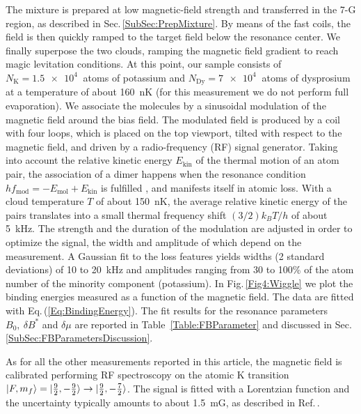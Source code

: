 The mixture is prepared at low magnetic-field strength and transferred in the 7-G region, as described in Sec.\,\ref{SubSec:PrepMixture}. By means of the fast coils, the field is then quickly ramped to the target field below the resonance center. We finally superpose the two clouds, ramping the magnetic field gradient to reach magic levitation conditions. At this point, our sample consists  of {$N_{\mathrm{K}}=\SI{1.5e4}{}$} atoms of potassium and {$N_{\mathrm{Dy}}=\SI{7e4}{}$} atoms of dysprosium at a temperature of about \SI{160}{\nano\kelvin} (for this measurement we do not perform full evaporation).
We associate the molecules by a sinusoidal modulation of the magnetic field around the bias field. The modulated field is produced by a coil with four loops, which is placed on the top viewport, tilted with respect to the magnetic field, and driven by a radio-frequency (RF) signal generator. Taking into account the relative kinetic energy $E_{\mathrm{kin}}$ of the thermal motion of an atom pair, the association of a dimer happens when the resonance condition $hf_{\mathrm{mod}}=-E_{\mathrm{mol}}+E_{\mathrm{kin}}$ is fulfilled \cite{Hanna2007AOM,Weber2008aou,Mohapatra2015has}, and manifests itself in atomic loss. With a cloud temperature $T$ of about \SI{150}{\nano\kelvin}, the average relative kinetic energy of the pairs translates into a small thermal frequency shift $(3/2)k_BT/h$ of about \SI{5}{\kilo\hertz}.
The strength and the duration of the modulation are adjusted in order to optimize the signal, the width and amplitude of which depend on the measurement. A Gaussian fit to the loss features yields widths (2 standard deviations) of 10 to \SI{20}{\kilo\hertz} and amplitudes ranging from 30 to 100\% of the atom number of the minority component (potassium).
In Fig.\,\ref{Fig4:Wiggle} we plot the binding energies measured as a function of the magnetic field. The data are fitted with Eq.\,(\ref{Eq:BindingEnergy}).
The fit results for the resonance parameters $B_0,\ \delta B^*$ and $\delta\mu$ are reported in Table \,\ref{Table:FBParameter} and discussed in Sec.\,\ref{SubSec:FBParametersDiscussion}.

As for all the other measurements reported in this article, the magnetic field is calibrated performing RF spectroscopy on the atomic K transition $\ket{F,m_f}=\ket{\frac{9}{2},-\frac{9}{2}}\rightarrow\ket{\frac{9}{2},-\frac{7}{2}}$. The signal is fitted with a Lorentzian function and the uncertainty typically amounts to about \SI{1.5}{\milli G}, as described in Ref.\,\cite
{Ye2022ool}.

